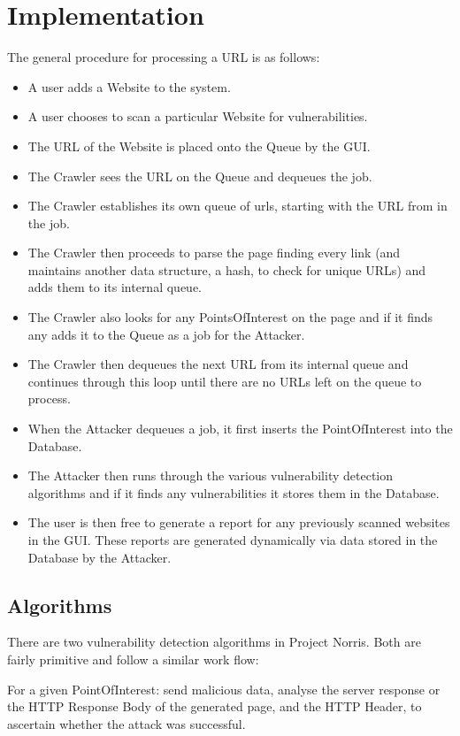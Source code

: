 \documentclass[12pt,a4paper]{article}
\begin{document}
\section{Implementation}
The general procedure for processing a URL is as follows:

\begin{itemize}
    \item A user adds a Website to the system.
    \item A user chooses to scan a particular Website for vulnerabilities.
    \item The URL of the Website is placed onto the Queue by the GUI.
    \item The Crawler sees the URL on the Queue and dequeues the job.
    \item The Crawler establishes its own queue of urls, starting with the URL from in the job.
    \item The Crawler then proceeds to parse the page finding every link (and maintains another data structure, a hash, to check for unique URLs) and adds them to its internal queue.
    \item The Crawler also looks for any PointsOfInterest on the page and if it finds any adds it to the Queue as a job for the Attacker.
    \item The Crawler then dequeues the next URL from its internal queue and continues through this loop until there are no URLs left on the queue to process.
    \item When the Attacker dequeues a job, it first inserts the PointOfInterest into the Database.
    \item The Attacker then runs through the various vulnerability detection algorithms and if it finds any vulnerabilities it stores them in the Database.
    \item The user is then free to generate a report for any previously scanned websites in the GUI.  These reports are generated dynamically via data stored in the Database by the Attacker.
\end{itemize}

\subsection{Algorithms}
There are two vulnerability detection algorithms in Project Norris.  Both are fairly primitive and follow a similar work flow:

For a given PointOfInterest: send malicious data, analyse the server response or the HTTP Response Body of the generated page, and the HTTP Header, to ascertain whether the attack was successful.
\end{document}
